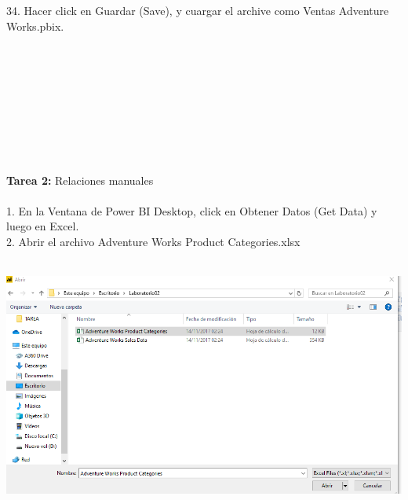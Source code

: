 \begin{flushleft}
\begin{itemize}
34. Hacer click en Guardar (Save), y cuargar el archive como Ventas Adventure Works.pbix.\\


\textbf{ }\\
\textbf{ }\\
\textbf{ }\\
\textbf{ }\\
\textbf{ }\\
\textbf{ }\\
\textbf{ }\\
\textbf{ }\\
\textbf{ }\\
\textbf{Tarea 2:  } Relaciones manuales
\textbf{ }\\
\textbf{ }\\
1. En la Ventana de Power BI Desktop, click en Obtener Datos (Get Data) y luego en Excel.\\
2. Abrir el archivo Adventure Works Product Categories.xlsx\\
\textbf{ }\\
\begin{center}
	\includegraphics[width=20cm]{./Imagenes/img20} 
	\end{center}
\textbf{ }\\


\end{itemize}
\end{flushleft}
